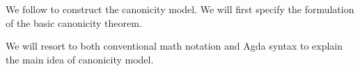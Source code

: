 We follow \citep{sterling2019algebraic,coquand2018canonicity} to construct the canonicity model. We will first specify the formulation of the basic canonicity theorem. 

We will resort to both conventional math notation and Agda syntax to explain the main idea of canonicity model. 


